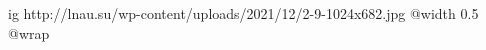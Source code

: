  
 
 
 
 

	
\ifcmt
  ig http://lnau.su/wp-content/uploads/2021/12/2-9-1024x682.jpg
  @width 0.5
  @wrap 
\fi

